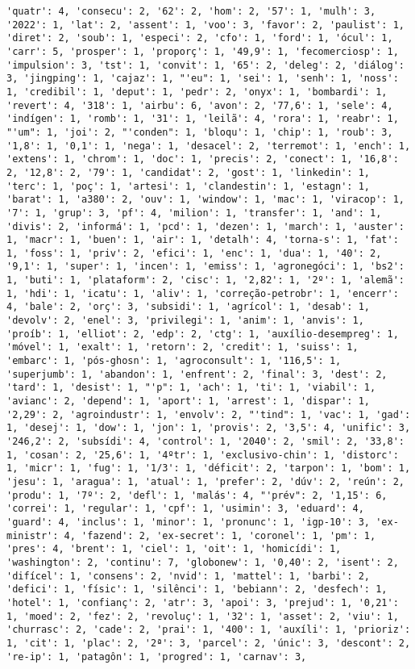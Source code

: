 \documentclass[11pt]{article}
\begin{document}
\begin{Verbatim}[commandchars=\\\{\}]
'quatr': 4, 'consecu': 2, '62': 2, 'hom': 2, '57': 1, 'mulh': 3, '2022': 1, 'lat': 2, 'assent': 1, 'voo': 3, 'favor': 2, 'paulist': 1, 'diret': 2, 'soub': 1, 'especi': 2, 'cfo': 1, 'ford': 1, 'ócul': 1, 'carr': 5, 'prosper': 1, 'proporç': 1, '49,9': 1, 'fecomerciosp': 1, 'impulsion': 3, 'tst': 1, 'convit': 1, '65': 2, 'deleg': 2, 'diálog': 3, 'jingping': 1, 'cajaz': 1, "'eu": 1, 'sei': 1, 'senh': 1, 'noss': 1, 'credibil': 1, 'deput': 1, 'pedr': 2, 'onyx': 1, 'bombardi': 1, 'revert': 4, '318': 1, 'airbu': 6, 'avon': 2, '77,6': 1, 'sele': 4, 'indígen': 1, 'romb': 1, '31': 1, 'leilã': 4, 'rora': 1, 'reabr': 1, "'um": 1, 'joi': 2, "'conden": 1, 'bloqu': 1, 'chip': 1, 'roub': 3, '1,8': 1, '0,1': 1, 'nega': 1, 'desacel': 2, 'terremot': 1, 'ench': 1, 'extens': 1, 'chrom': 1, 'doc': 1, 'precis': 2, 'conect': 1, '16,8': 2, '12,8': 2, '79': 1, 'candidat': 2, 'gost': 1, 'linkedin': 1, 'terc': 1, 'poç': 1, 'artesi': 1, 'clandestin': 1, 'estagn': 1, 'barat': 1, 'a380': 2, 'ouv': 1, 'window': 1, 'mac': 1, 'viracop': 1, '7': 1, 'grup': 3, 'pf': 4, 'milion': 1, 'transfer': 1, 'and': 1, 'divis': 2, 'informá': 1, 'pcd': 1, 'dezen': 1, 'march': 1, 'auster': 1, 'macr': 1, 'buen': 1, 'air': 1, 'detalh': 4, 'torna-s': 1, 'fat': 1, 'foss': 1, 'priv': 2, 'efici': 1, 'enc': 1, 'dua': 1, '40': 2, '9,1': 1, 'super': 1, 'incen': 1, 'emiss': 1, 'agronegóci': 1, 'bs2': 1, 'buti': 1, 'plataform': 2, 'cisc': 1, '2,82': 1, '2º': 1, 'alemã': 1, 'hdi': 1, 'icatu': 1, 'aliv': 1, 'correção-petrobr': 1, 'encerr': 4, 'bale': 2, 'orç': 3, 'subsidi': 1, 'agrícol': 1, 'desab': 1, 'devolv': 2, 'enel': 3, 'privilegi': 1, 'anim': 1, 'anvis': 1, 'proíb': 1, 'elliot': 2, 'edp': 2, 'ctg': 1, 'auxílio-desempreg': 1, 'móvel': 1, 'exalt': 1, 'retorn': 2, 'credit': 1, 'suiss': 1, 'embarc': 1, 'pós-ghosn': 1, 'agroconsult': 1, '116,5': 1, 'superjumb': 1, 'abandon': 1, 'enfrent': 2, 'final': 3, 'dest': 2, 'tard': 1, 'desist': 1, "'p": 1, 'ach': 1, 'ti': 1, 'viabil': 1, 'avianc': 2, 'depend': 1, 'aport': 1, 'arrest': 1, 'dispar': 1, '2,29': 2, 'agroindustr': 1, 'envolv': 2, "'tind": 1, 'vac': 1, 'gad': 1, 'desej': 1, 'dow': 1, 'jon': 1, 'provis': 2, '3,5': 4, 'unific': 3, '246,2': 2, 'subsídi': 4, 'control': 1, '2040': 2, 'smil': 2, '33,8': 1, 'cosan': 2, '25,6': 1, '4ºtr': 1, 'exclusivo-chin': 1, 'distorc': 1, 'micr': 1, 'fug': 1, '1/3': 1, 'déficit': 2, 'tarpon': 1, 'bom': 1, 'jesu': 1, 'aragua': 1, 'atual': 1, 'prefer': 2, 'dúv': 2, 'reún': 2, 'produ': 1, '7º': 2, 'defl': 1, 'malás': 4, "'prév": 2, '1,15': 6, 'correi': 1, 'regular': 1, 'cpf': 1, 'usimin': 3, 'eduard': 4, 'guard': 4, 'inclus': 1, 'minor': 1, 'pronunc': 1, 'igp-10': 3, 'ex-ministr': 4, 'fazend': 2, 'ex-secret': 1, 'coronel': 1, 'pm': 1, 'pres': 4, 'brent': 1, 'ciel': 1, 'oit': 1, 'homicídi': 1, 'washington': 2, 'continu': 7, 'globonew': 1, '0,40': 2, 'isent': 2, 'difícel': 1, 'consens': 2, 'nvid': 1, 'mattel': 1, 'barbi': 2, 'defici': 1, 'físic': 1, 'silênci': 1, 'bebiann': 2, 'desfech': 1, 'hotel': 1, 'confianç': 2, 'atr': 3, 'apoi': 3, 'prejud': 1, '0,21': 1, 'moed': 2, 'fez': 2, 'revoluç': 1, '32': 1, 'asset': 2, 'viu': 1, 'churrasc': 2, 'cade': 2, 'prai': 1, '400': 1, 'auxíli': 1, 'prioriz': 1, 'cit': 1, 'plac': 2, '2ª': 3, 'parcel': 2, 'únic': 3, 'descont': 2, 're-ip': 1, 'patagôn': 1, 'progred': 1, 'carnav': 3, 
\end{Verbatim}
\end{document}
